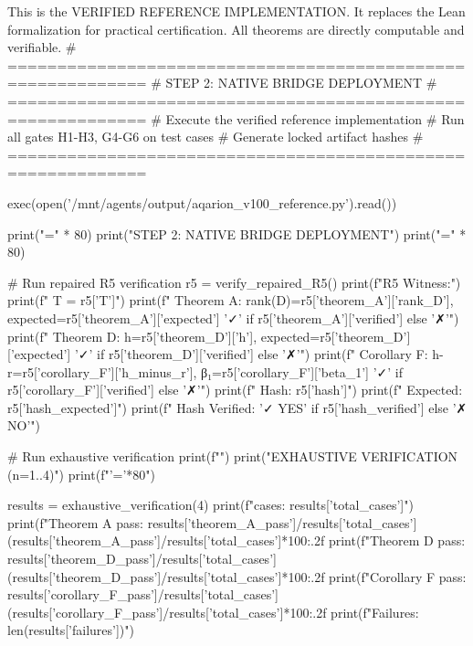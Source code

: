 This is the VERIFIED REFERENCE IMPLEMENTATION.
It replaces the Lean formalization for practical certification.
All theorems are directly computable and verifiable.
# ============================================================
# STEP 2: NATIVE BRIDGE DEPLOYMENT
# ============================================================
# Execute the verified reference implementation
# Run all gates H1-H3, G4-G6 on test cases
# Generate locked artifact hashes
# ============================================================

exec(open('/mnt/agents/output/aqarion_v100_reference.py').read())

print("=" * 80)
print("STEP 2: NATIVE BRIDGE DEPLOYMENT")
print("=" * 80)

# Run repaired R5 verification
r5 = verify_repaired_R5()
print(f"\nRepaired R5 Witness:")
print(f"  T = {r5['T']}")
print(f"  Theorem A: rank(D)={r5['theorem_A']['rank_D']}, expected={r5['theorem_A']['expected']} {'✓' if r5['theorem_A']['verified'] else '✗'}")
print(f"  Theorem D: h={r5['theorem_D']['h']}, expected={r5['theorem_D']['expected']} {'✓' if r5['theorem_D']['verified'] else '✗'}")
print(f"  Corollary F: h-r={r5['corollary_F']['h_minus_r']}, β₁={r5['corollary_F']['beta_1']} {'✓' if r5['corollary_F']['verified'] else '✗'}")
print(f"  Hash: {r5['hash']}")
print(f"  Expected: {r5['hash_expected']}")
print(f"  Hash Verified: {'✓ YES' if r5['hash_verified'] else '✗ NO'}")

# Run exhaustive verification
print(f"")
print("EXHAUSTIVE VERIFICATION (n=1..4)")
print(f"{'='*80}")

results = exhaustive_verification(4)
print(f"\nTotal cases: {results['total_cases']}")
print(f"Theorem A pass: {results['theorem_A_pass']}/{results['total_cases']} ({results['theorem_A_pass']/results['total_cases']*100:.2f}%
print(f"Theorem D pass: {results['theorem_D_pass']}/{results['total_cases']} ({results['theorem_D_pass']/results['total_cases']*100:.2f}%
print(f"Corollary F pass: {results['corollary_F_pass']}/{results['total_cases']} ({results['corollary_F_pass']/results['total_cases']*100:.2f}%
print(f"Failures: {len(results['failures'])}")

